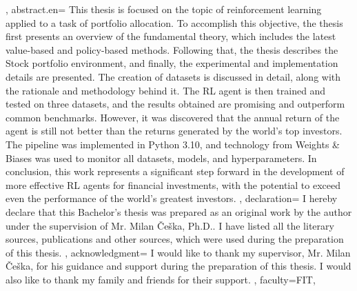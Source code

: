 {{    }, %
    abstract.en={
        This thesis is focused on the topic of reinforcement learning applied to a task of portfolio allocation. To accomplish this objective, the thesis first presents an overview of the fundamental theory, which includes the latest value-based and policy-based methods. Following that, the thesis describes the Stock portfolio environment, and finally, the experimental and implementation details are presented. The creation of datasets is discussed in detail, along with the rationale and methodology behind it. The RL agent is then trained and tested on three datasets, and the results obtained are promising and outperform common benchmarks. However, it was discovered that the annual return of the agent is still not better than the returns generated by the world's top investors. The pipeline was implemented in Python 3.10, and technology from Weights & Biases was used to monitor all datasets, models, and hyperparameters. In conclusion, this work represents a significant step forward in the development of more effective RL agents for financial investments, with the potential to exceed even the performance of the world's greatest investors.
    }, %
    declaration={
        I hereby declare that this Bachelor's thesis was prepared as an original work by the author under the supervision of Mr. Milan Češka, Ph.D.. I have listed all the literary sources, publications and other sources, which were used during the preparation of this thesis.
    },
%
    acknowledgment={
        I would like to thank my supervisor, Mr. Milan Češka, for his guidance and support during the preparation of this thesis. I would also like to thank my family and friends for their support.
    },
%
%        
%
    faculty={FIT}, %
}

